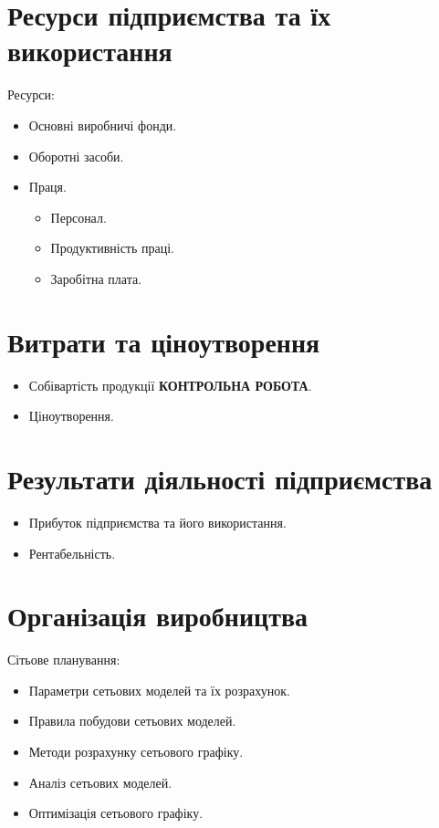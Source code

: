 \documentclass[a4paper,12pt,notitlepage,pdftex,headsepline]{scrartcl}
\begin{document}
\section{Ресурси підприємства та їх використання}
  Ресурси:
    \begin{itemize}
      \item Основні виробничі фонди.
      \item Оборотні засоби.
      \item Праця.
        \begin{itemize}
          \item Персонал.
          \item Продуктивність праці.
          \item Заробітна плата.
        \end{itemize}
    \end{itemize}
\section{Витрати та ціноутворення}
  \begin{itemize}
    \item Собівартість продукції \textbf{КОНТРОЛЬНА РОБОТА}.
    \item Ціноутворення.
  \end{itemize}
\section{Результати діяльності підприємства}
  \begin{itemize}
    \item Прибуток підприємства та його використання.
    \item Рентабельність.
  \end{itemize}
\section{Організація виробництва}
  Сітьове планування:
    \begin{itemize}
      \item Параметри сетьових моделей та їх розрахунок.
      \item Правила побудови сетьових моделей.
      \item Методи розрахунку сетьового графіку.
      \item Аналіз сетьових моделей.
      \item Оптимізація сетьового графіку.
    \end{itemize}
\end{document}
